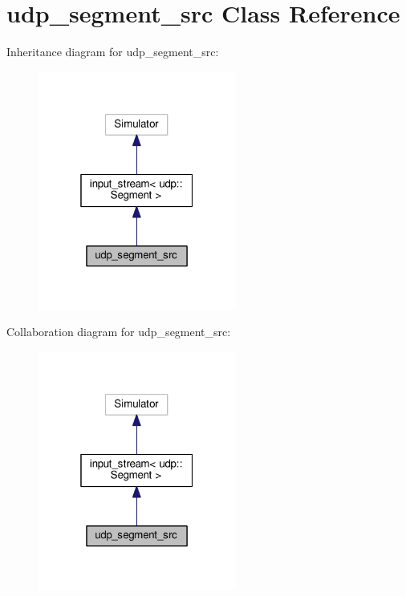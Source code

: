 \hypertarget{classudp__segment__src}{}\section{udp\+\_\+segment\+\_\+src Class Reference}
\label{classudp__segment__src}


Inheritance diagram for udp\+\_\+segment\+\_\+src\+:
\nopagebreak
\begin{figure}[H]
\begin{center}
\leavevmode
\includegraphics[width=184pt]{classudp__segment__src__inherit__graph}
\end{center}
\end{figure}


Collaboration diagram for udp\+\_\+segment\+\_\+src\+:
\nopagebreak
\begin{figure}[H]
\begin{center}
\leavevmode
\includegraphics[width=184pt]{classudp__segment__src__coll__graph}
\end{center}
\end{figure}
